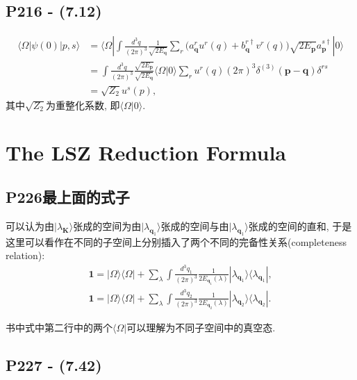 \subsection{P216 - (7.12)}
\begin{equation}
  \begin{aligned}
    \langle \Omega|\psi(0)|p,s\rangle & = \langle \Omega|\int \frac{d^3 q}{(2\pi)^3}\frac{1}{\sqrt{2E_{\mathbf{q}}}} \sum_{r}\biggl(a^r_\mathbf{q}u^r(q) + b^{r\dagger}_\mathbf{q}v^r(q) \biggr) \sqrt{2E_{\mathbf{p}}} a^{s\dagger}_\mathbf{p}|0\rangle \\
                                      & = \int \frac{d^3 q}{(2\pi)^3}\frac{\sqrt{2E_{\mathbf{p}}}}{\sqrt{2E_{\mathbf{q}}}} \langle \Omega|0\rangle \sum_{r}u^r(q) (2\pi)^3 \delta^{(3)}(\mathbf{p} - \mathbf{q}) \delta^{rs}                             \\
                                      & = \sqrt{Z_2} u^s(p),
  \end{aligned}
\end{equation}
其中$\sqrt{Z_2}$为重整化系数, 即$\langle \Omega|0\rangle$.

\section{The LSZ Reduction Formula}

\subsection{P226最上面的式子}

可以认为由$|\lambda_{\mathbf{K}}\rangle$张成的空间为由$|\lambda_{\mathbf{q}_1}\rangle$张成的空间与由$|\lambda_{\mathbf{q}_1}\rangle$张成的空间的直和, 于是这里可以看作在不同的子空间上分别插入了两个不同的完备性关系(completeness relation):
\begin{gather}
  \mathbf{1} = |\Omega \rangle\langle \Omega| + \sum_{\lambda} \int \frac{d^3 q_1}{(2\pi)^3} \frac{1}{2E_{\mathbf{q}_1}(\lambda)}|\lambda_{\mathbf{q}_1}\rangle \langle \lambda_{\mathbf{q}_1}|, \\
  \mathbf{1} = |\Omega \rangle\langle \Omega| + \sum_{\lambda} \int \frac{d^3 q_2}{(2\pi)^3} \frac{1}{2E_{\mathbf{q}_2}(\lambda)}|\lambda_{\mathbf{q}_2}\rangle \langle \lambda_{\mathbf{q}_2}|.
\end{gather}

书中式中第二行中的两个$\langle \Omega|$可以理解为不同子空间中的真空态.

\subsection{P227 - (7.42)}

